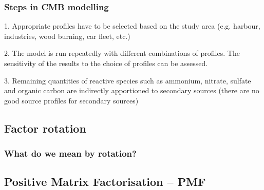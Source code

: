 ﻿\documentclass[ignorenonframetext]{beamer}
\begin{document}
\begin{frame}
\frametitle{Steps in CMB modelling}
1. \enspace Appropriate profiles have to be selected based on the study area (e.g. harbour, industries, wood burning, car fleet, etc.)\newline

2. \enspace The model is run repeatedly with different combinations of profiles. The sensitivity of the results to the choice of profiles can be assessed.\newline

3. \enspace Remaining quantities of reactive species such as ammonium, nitrate, sulfate and organic carbon  are indirectly apportioned to secondary sources (there are no good source profiles for secondary sources)
\end{frame}



\subsection{Factor rotation}

\begin{frame}
\frametitle{What do we mean by rotation?}

\end{frame}

\subsection{Positive Matrix Factorisation -- PMF}
\end{document}
